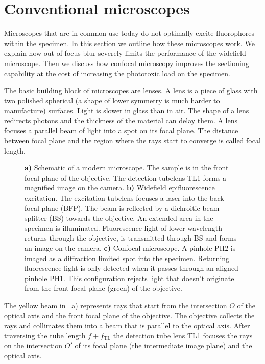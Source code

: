 \section{Conventional microscopes}
\begin{summary}
  Microscopes that are in common use today do not optimally excite
  fluorophores within the specimen. In this section we outline how
  these microscopes work. We explain how out-of-focus blur severely
  limits the performance of the widefield microscope. Then we discuss
  how confocal microscopy improves the sectioning capability at the
  cost of increasing the phototoxic load on the specimen.
\end{summary}
The basic building block of microscopes are lenses. A lens is a piece
of glass with two polished spherical (a shape of lower symmetry is
much harder to manufacture) surfaces. Light is slower in glass than in
air. The shape of a lens redirects photons and the thickness of the
material can delay them. A lens focuses a parallel beam of light into
a spot on its focal plane. The distance between focal plane and the
region where the rays start to converge is called focal length.
\begin{figure}[!hbt]
  \centering
  
  \caption{{\bf a)} Schematic of a modern microscope. The sample is in
    the front focal plane of the objective. The detection tubelens TL1
    forms a magnified image on the camera. {\bf b)} Widefield
    epifluorescence excitation. The excitation tubelens focuses a
    laser into the back focal plane (BFP). The beam is reflected by a
    dichroitic beam splitter (BS) towards the objective. An extended
    area in the specimen is illuminated. Fluorescence light of lower
    wavelength returns through the objective, is transmitted through
    BS and forms an image on the camera. {\bf c)} Confocal
    microscope. A pinhole PH2 is imaged as a diffraction limited spot
    into the specimen. Returning fluorescence light is only detected
    when it passes through an aligned pinhole PH1. This configuration
    rejects light that doesn't originate from the front focal plane
    (green) of the objective.}
  \label{fig:widefield-microscope}
\end{figure}

The yellow beam in ~a) represents
rays that start from the intersection $O$ of the optical axis and the
front focal plane of the objective. The objective collects the rays
and collimates them into a beam that is parallel to the optical
axis. After traversing the tube length $f+f_\textrm{TL}$ the detection
tube lens TL1 focuses the rays on the intersection $O'$ of its focal
plane (the intermediate image plane) and the optical axis.

